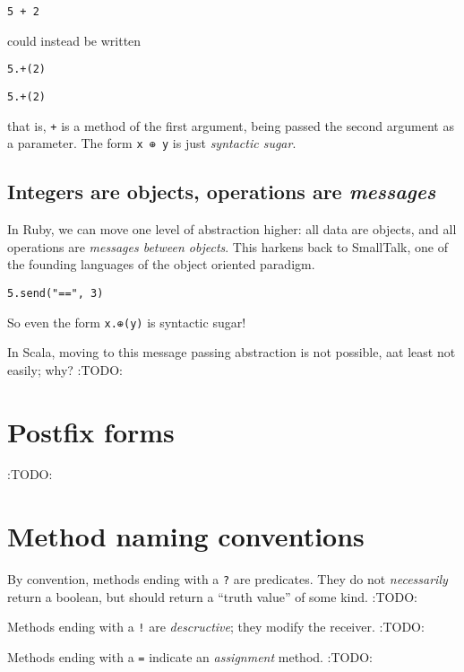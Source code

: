 \documentclass[11pt]{article}
\begin{document}
\begin{verbatim}
5 + 2
\end{verbatim}

could instead be written
\begin{verbatim}
5.+(2)
\end{verbatim}

\begin{verbatim}
5.+(2)
\end{verbatim}

that is, \texttt{+} is a method of the first argument, being passed
the second argument as a parameter.
The form \texttt{x ⊕ y} is just \emph{syntactic sugar}.

\subsection{Integers are objects, operations are \emph{messages}}
\label{sec:orgbfc6cce}
In Ruby, we can move one level of abstraction higher:
all data are objects, and all operations are \emph{messages between objects}.
This harkens back to SmallTalk, one of the founding languages
of the object oriented paradigm.
\begin{verbatim}
5.send("==", 3)
\end{verbatim}

So even the form \texttt{x.⊕(y)} is syntactic sugar!

In Scala, moving to this message passing abstraction
is not possible, aat least not easily; why?
:TODO:

\section{Postfix forms}
\label{sec:org274bd90}
:TODO:

\section{Method naming conventions}
\label{sec:orga1f4c67}
By convention, methods ending with a \texttt{?} are predicates.
They do not \emph{necessarily} return a boolean, but should
return a “truth value” of some kind.
:TODO:

Methods ending with a \texttt{!} are \emph{descructive}; they modify the receiver.
:TODO:

Methods ending with a \texttt{=} indicate an \emph{assignment} method.
:TODO:
\end{document}
